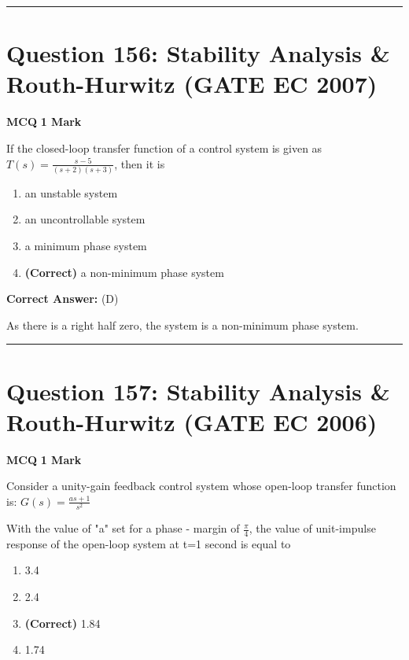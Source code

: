 \documentclass[11pt,a4paper]{article}
\begin{document}
\vspace{1.5em}
\hrule
\vspace{1.5em}

\section*{Question 156: Stability Analysis \& Routh-Hurwitz (GATE EC 2007)}
\noindent \textbf{\color{primary}MCQ} \hfill \textbf{\color{secondary}1 Mark}


\noindent If the closed-loop transfer function of a control system is given as $T(s)=\frac{s-5}{(s+2)(s+3)}$, then it is


\begin{enumerate}[label=(\Alph*)]
    \item an unstable system
    \item an uncontrollable system
    \item a minimum phase system
    \item \textbf{(Correct)} a non-minimum phase system
\end{enumerate}

\noindent \textbf{Correct Answer:} (D)

\begin{tcolorbox}[solbox, title=Detailed Solution -- Question 156]
As there is a right half zero, the system is a non-minimum phase system.
\end{tcolorbox}

\vspace{1.5em}
\hrule
\vspace{1.5em}

\section*{Question 157: Stability Analysis \& Routh-Hurwitz (GATE EC 2006)}
\noindent \textbf{\color{primary}MCQ} \hfill \textbf{\color{secondary}1 Mark}


\noindent Consider a unity-gain feedback control system whose open-loop transfer function is: 
$G(s)=\frac{as+1}{s^{2}}$ 

With the value of "a" set for a phase - margin of $\frac{\pi }{4}$, the value of unit-impulse response of the open-loop system at t=1 second is equal to


\begin{enumerate}[label=(\Alph*)]
    \item 3.4
    \item 2.4
    \item \textbf{(Correct)} 1.84
    \item 1.74
\end{enumerate}
\end{document}
